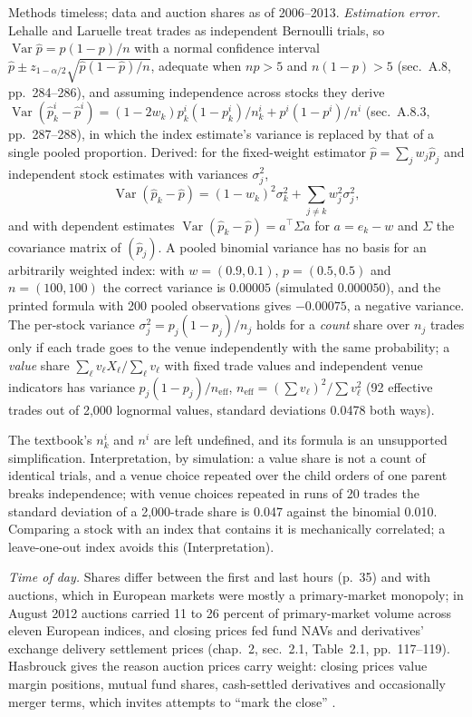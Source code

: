 \begin{qfmethod}
 Methods timeless; data and auction shares as of 2006--2013. \emph{Estimation error.} Lehalle and Laruelle treat trades as independent Bernoulli trials, so $\operatorname{Var}\hat p=p(1-p)/n$ with a normal confidence interval $\hat p\pm z_{1-\alpha/2}\sqrt{\hat p(1-\hat p)/n}$, adequate when $np>5$ and $n(1-p)>5$ (sec.~A.8, pp.~284--286), and assuming independence across stocks they derive $\operatorname{Var}(\hat p^i_k-\hat p^i)=(1-2w_k)p^i_k(1-p^i_k)/n^i_k+p^i(1-p^i)/n^i$ (sec.~A.8.3, pp.~287--288), in which the index estimate's variance is replaced by that of a single pooled proportion. Derived: for the fixed-weight estimator $\hat p=\sum_jw_j\hat p_j$ and independent stock estimates with variances $\sigma_j^2$,
\[ \operatorname{Var}(\hat p_k-\hat p)=(1-w_k)^2\sigma_k^2+\sum_{j\ne k}w_j^2\sigma_j^2, \]
and with dependent estimates $\operatorname{Var}(\hat p_k-\hat p)=a^\top\Sigma a$ for $a=e_k-w$ and $\Sigma$ the covariance matrix of $(\hat p_j)$. A pooled binomial variance has no basis for an arbitrarily weighted index: with $w=(0.9,0.1)$, $p=(0.5,0.5)$ and $n=(100,100)$ the correct variance is $0.00005$ (simulated $0.000050$), and the printed formula with 200 pooled observations gives $-0.00075$, a negative variance. The per-stock variance $\sigma_j^2=p_j(1-p_j)/n_j$ holds for a \emph{count} share over $n_j$ trades only if each trade goes to the venue independently with the same probability; a \emph{value} share $\sum_\ell v_\ell X_\ell/\sum_\ell v_\ell$ with fixed trade values and independent venue indicators has variance $p_j(1-p_j)/n_{\mathrm{eff}}$, $n_{\mathrm{eff}}=(\sum v_\ell)^2/\sum v_\ell^2$ (92 effective trades out of 2{,}000 lognormal values, standard deviations 0.0478 both ways).

The textbook's $n^i_k$ and $n^i$ are left undefined, and its formula is an unsupported simplification. Interpretation, by simulation: a value share is not a count of identical trials, and a venue choice repeated over the child orders of one parent breaks independence; with venue choices repeated in runs of 20 trades the standard deviation of a 2{,}000-trade share is 0.047 against the binomial 0.010. Comparing a stock with an index that contains it is mechanically correlated; a leave-one-out index avoids this (Interpretation).

\emph{Time of day.} Shares differ between the first and last hours (p.~35) and with auctions, which in European markets were mostly a primary-market monopoly; in August 2012 auctions carried 11 to 26 percent of primary-market volume across eleven European indices, and closing prices fed fund NAVs and derivatives' exchange delivery settlement prices (chap.~2, sec.~2.1, Table~2.1, pp.~117--119). Hasbrouck gives the reason auction prices carry weight: closing prices value margin positions, mutual fund shares, cash-settled derivatives and occasionally merger terms, which invites attempts to ``mark the close'' \citep[chap.~2, sec.~2.4, p.~18]{s6-hasbrouck}.


\end{qfmethod}
